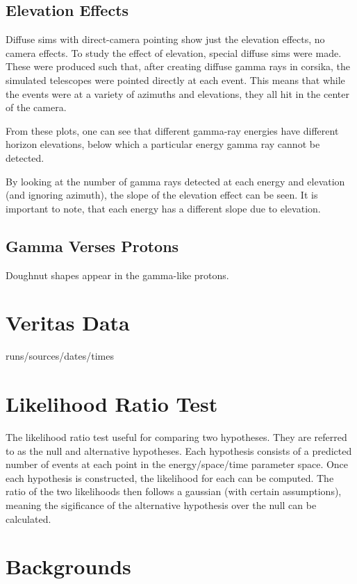 \subsection{Elevation Effects}

Diffuse sims with direct-camera pointing show just the elevation effects, no camera effects.
To study the effect of elevation, special diffuse sims were made.
These were produced such that, after creating diffuse gamma rays in corsika, the simulated telescopes were pointed directly at each event.
This means that while the events were at a variety of azimuths and elevations, they all hit in the center of the camera.

From these plots, one can see that different gamma-ray energies have different horizon elevations, below which a particular energy gamma ray cannot be detected.

By looking at the number of gamma rays detected at each energy and elevation (and ignoring azimuth), the slope of the elevation effect can be seen.
It is important to note, that each energy has a different slope due to elevation.


\subsection{Gamma Verses Protons}

Doughnut shapes appear in the gamma-like protons.


\section{Veritas Data}
runs/sources/dates/times

\section{Likelihood Ratio Test}
The likelihood ratio test useful for comparing two hypotheses.
They are referred to as the null and alternative hypotheses.
Each hypothesis consists of a predicted number of events at each point in the energy/space/time parameter space.
Once each hypothesis is constructed, the likelihood for each can be computed.
The ratio of the two likelihoods then follows a gaussian (with certain assumptions), meaning the sigificance of the alternative hypothesis over the null can be calculated.

\section{Backgrounds}

